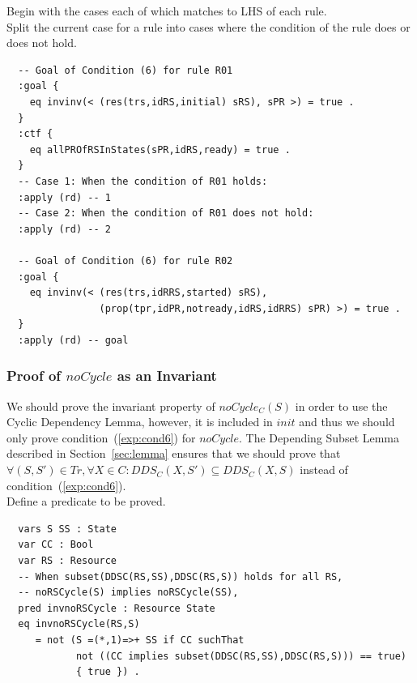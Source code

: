\documentclass[12pt]{report}
\begin{document}
 Begin with the cases each of which matches to
LHS of each rule. \\ 
 Split the current case for a rule into
cases where the condition of the rule does or does not hold. 
\small
\begin{verbatim}
  -- Goal of Condition (6) for rule R01
  :goal {
    eq invinv(< (res(trs,idRS,initial) sRS), sPR >) = true .
  }
  :ctf {
    eq allPROfRSInStates(sPR,idRS,ready) = true .
  }
  -- Case 1: When the condition of R01 holds:
  :apply (rd) -- 1
  -- Case 2: When the condition of R01 does not hold:
  :apply (rd) -- 2

  -- Goal of Condition (6) for rule R02
  :goal {
    eq invinv(< (res(trs,idRRS,started) sRS),
                (prop(tpr,idPR,notready,idRS,idRRS) sPR) >) = true .
  }
  :apply (rd) -- goal
\end{verbatim}
\normalsize

\subsubsection*{Proof of $noCycle$ as an Invariant}
We should prove the invariant property of $noCycle_C(S)$ in order to
use the Cyclic Dependency Lemma, however, it is included in $init$ and
thus we should only prove condition~(\ref{exp:cond6}) for $noCycle$.
The Depending Subset Lemma described in Section~\ref{sec:lemma}
ensures that we should prove that $\forall (S,S') \in Tr, \forall X\in
C:DDS_C(X,S')\subseteq DDS_C(X,S)$ instead of
condition~(\ref{exp:cond6}).\\

 Define a predicate to be proved. 
\small
\begin{verbatim}
  vars S SS : State
  var CC : Bool
  var RS : Resource
  -- When subset(DDSC(RS,SS),DDSC(RS,S)) holds for all RS,
  -- noRSCycle(S) implies noRSCycle(SS),
  pred invnoRSCycle : Resource State
  eq invnoRSCycle(RS,S) 
     = not (S =(*,1)=>+ SS if CC suchThat
            not ((CC implies subset(DDSC(RS,SS),DDSC(RS,S))) == true)
            { true }) .
\end{verbatim}
\normalsize
\end{document}
